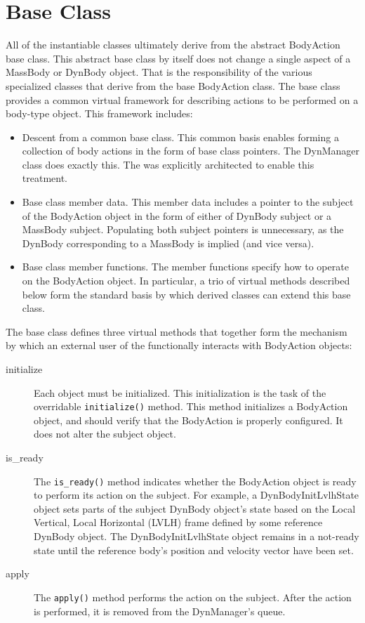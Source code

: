 \section*{\ModelDesc Base Class}
All of the instantiable \ModelDesc classes ultimately derive from the abstract BodyAction
base class. This abstract base class by itself does not change a single aspect of
a MassBody or DynBody object. That is the
responsibility of the various specialized classes that derive from the base BodyAction
class. The base class provides a common virtual framework for describing actions to be
performed on a body-type object.
This framework includes:
\begin{itemize}
\item Descent from a common base class. This common basis enables forming a
collection of body actions in the form of base class pointers. The DynManager
class does exactly this. The \ModelDesc was explicitly architected to enable
this treatment.
\item Base class member data. This member data includes a pointer to the
subject of the BodyAction object in the form of either of DynBody subject or a
MassBody subject. Populating both subject pointers is unnecessary, as the
DynBody corresponding to a MassBody is implied (and vice versa).
\item Base class member functions. The member functions specify how to operate
on the BodyAction object. In particular, a trio of virtual methods described
below form the standard basis by which derived classes can extend
this base class.
\end{itemize}

The base class defines three virtual methods that together form the
mechanism by which an external user of the \ModelDesc functionally
interacts with BodyAction objects:
\begin{description}
\item[initialize]
Each \ModelDesc object must be initialized.
This initialization is the task of the overridable {\tt initialize()}
method. This method initializes a BodyAction object, and should verify that the BodyAction is
properly configured.
It does not alter the subject object.
\item[is\_ready]
The {\tt is\_ready()} method indicates whether the BodyAction object is
ready to perform its action on the subject.
For example, a DynBodyInitLvlhState object sets parts of the subject
DynBody object's state based on the Local Vertical, Local Horizontal (LVLH)
frame defined by some reference DynBody object.
The DynBodyInitLvlhState object remains in a not-ready state
until the reference body's position and velocity vector have been set.
\item[apply]
The {\tt apply()} method performs the action on the subject.
After the action is performed, it is removed from the DynManager's queue.
\end{description}

